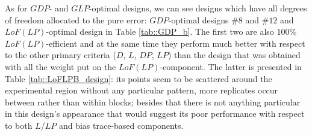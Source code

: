 As for $GDP$- and $GLP$-optimal designs, we can see designs which have all degrees of freedom allocated to the pure error: $GDP$-optimal designs \#$8$ and \#$12$ and $LoF(LP)$-optimal design in Table \ref{tab::GDP_b}. The first two are also $100\%$ $LoF(LP)$-efficient and at the same time they perform much better with respect to the other primary criteria ($D$, $L$, $DP$, $LP$) than the design that was obtained with all the weight put on the $LoF(LP)$-component. The latter is presented in Table \ref{tab::LoFLPB_design}: its points seem to be scattered around the experimental region without any particular pattern, more replicates occur between rather than within blocks; besides that there is not anything particular in this design's appearance that would suggest its poor performance with respect to both $L$/$LP$ and bias trace-based components.



